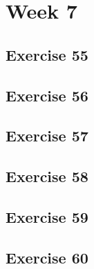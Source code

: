 



\section*{Week 7}
\subsection*{Exercise 55}





\newpage
\subsection*{Exercise 56}



\newpage
\subsection*{Exercise 57}



\newpage
\subsection*{Exercise 58}








\newpage
\subsection*{Exercise 59}

\newpage
\subsection*{Exercise 60}



